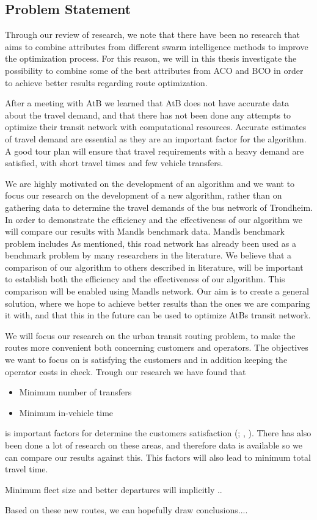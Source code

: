 \subsection{Problem Statement}
Through our review of research, we note that there have been no research that aims to combine attributes from different swarm intelligence methods to improve the optimization process. For this reason, we will in this thesis investigate the possibility to combine some of the best attributes from ACO and BCO in order to achieve better results regarding route optimization.

After a meeting with AtB we learned that AtB does not have accurate data about the travel demand, and that there has not been done any attempts to optimize their transit network with computational resources. Accurate estimates of travel demand are essential as they are an important factor for the algorithm. A good tour plan will ensure that travel requirements with a heavy demand are satisfied, with short travel times and few vehicle transfers. 

We are highly motivated on the development of an algorithm and we want to focus our research on the development of a new algorithm, rather than on gathering data to determine the travel demands of the bus network of Trondheim. In order to demonstrate the efficiency and the effectiveness of our algorithm we will compare our results with Mandls benchmark data. Mandls benchmark problem includes %
As mentioned, this road network has already been used as a benchmark problem by many researchers in the literature. We believe that a comparison of our algorithm to others described in literature, will be important to establish both the efficiency and the effectiveness of our algorithm. This comparison will be enabled using Mandls network. Our aim is to create a general solution, where we hope to achieve better results than the ones we are comparing it with, and that this in the future can be used to optimize AtBs transit network. 

We will focus our research on the urban transit routing problem, to make the routes more convenient both concerning customers and operators. The objectives we want to focus on is satisfying the customers and in addition keeping the operator costs in check. Trough our research we have found that 
\begin{itemize}
\item Minimum number of transfers
\item Minimum in-vehicle time
\end{itemize}
is important factors for determine the customers satisfaction ({\citet{kechagiopoulos14}; \citet{dias14}, \citet{yang07} }). There has also been done a lot of research on these areas, and therefore data is available so we can compare our results against this. This factors will also lead to minimum total travel time. 
\par
Minimum fleet size and better departures will implicitly ..
\par
Based on these new routes, we can hopefully draw conclusions....
